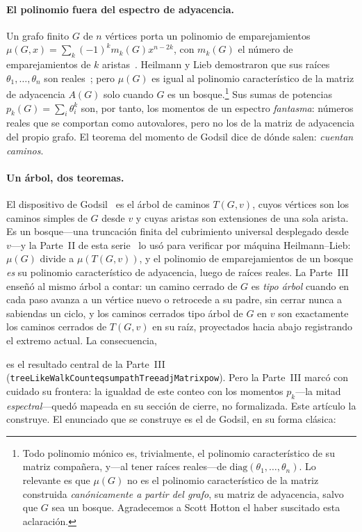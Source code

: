 \documentclass[11pt]{article}
\newcommand{\lean}[1]{{\def\_{\textunderscore\allowbreak}\texttt{#1}}}
\newcommand{\keyeq}[1]{\begin{center}\keybox{$\displaystyle #1$}\end{center}}
\begin{document}
\paragraph{El polinomio fuera del espectro de adyacencia.} Un grafo finito $G$ de $n$ v\'ertices porta
un polinomio de emparejamientos $\mu(G,x)=\sum_k(-1)^k m_k(G)x^{n-2k}$, con $m_k(G)$ el n\'umero de
emparejamientos de $k$ aristas~\cite{Farrell1979,LovaszPlummer}. Heilmann y Lieb demostraron que sus
ra\'ices $\theta_1,\dots,\theta_n$ son reales~\cite{HeilmannLieb}; pero $\mu(G)$ es igual al polinomio
caracter\'istico de la matriz de adyacencia $A(G)$ solo cuando $G$ es un bosque.\footnote{Todo
polinomio m\'onico es, trivialmente, el polinomio caracter\'istico de su matriz compa\~nera, y---al
tener ra\'ices reales---de $\mathrm{diag}(\theta_1,\dots,\theta_n)$. Lo relevante es que $\mu(G)$ no es
el polinomio caracter\'istico de la matriz construida \emph{can\'onicamente a partir del grafo}, su
matriz de adyacencia, salvo que $G$ sea un bosque. Agradecemos a Scott Hotton el haber suscitado esta
aclaraci\'on.} Sus sumas de potencias $p_k(G)=\sum_i\theta_i^k$ son, por tanto, los momentos de un
espectro \emph{fantasma}: n\'umeros reales que se comportan como autovalores, pero no los de la matriz
de adyacencia del propio grafo. El teorema del momento de Godsil
dice de d\'onde salen: \emph{cuentan caminos}.

\paragraph{Un \'arbol, dos teoremas.} El dispositivo de Godsil~\cite{Godsil1981a,Godsil1981b,GodsilBook}
es el \'arbol de caminos $T(G,v)$, cuyos v\'ertices son los caminos simples de $G$ desde $v$ y cuyas
aristas son extensiones de una sola arista. Es un bosque---una truncaci\'on finita del cubrimiento
universal desplegado desde $v$---y la Parte~II de esta serie~\cite{PartII} lo us\'o para verificar por
m\'aquina Heilmann--Lieb: $\mu(G)$ divide a $\mu(T(G,v))$, y el polinomio de emparejamientos de un
bosque \emph{es} su polinomio caracter\'istico de adyacencia, luego de ra\'ices reales. La
Parte~III~\cite{PartIII} ense\~n\'o al mismo \'arbol a contar: un camino cerrado de $G$ es \emph{tipo
\'arbol} cuando en cada paso avanza a un v\'ertice nuevo o retrocede a su padre, sin cerrar nunca a
sabiendas un ciclo, y los caminos cerrados tipo \'arbol de $G$ en $v$ son exactamente los caminos
cerrados de $T(G,v)$ en su ra\'iz, proyectados hacia abajo registrando el extremo actual. La
consecuencia,
\keyeq{\mathrm{treeLikeWalkCount}(G,k)\;=\;\sum_{v}\bigl[A(T(G,v))^{k}\bigr]_{\mathrm{ra\acute{\imath}z}},}
es el resultado central de la Parte~III (\lean{treeLikeWalkCount\_eq\_sum\_pathTree\_adjMatrix\_pow}).
Pero la Parte~III marc\'o con cuidado su frontera: la igualdad de este conteo con los momentos
$p_k$---la mitad \emph{espectral}---qued\'o mapeada en su secci\'on de cierre, no formalizada.
Este art\'iculo la construye. El enunciado que se construye es el de Godsil, en su forma cl\'asica:
\end{document}
